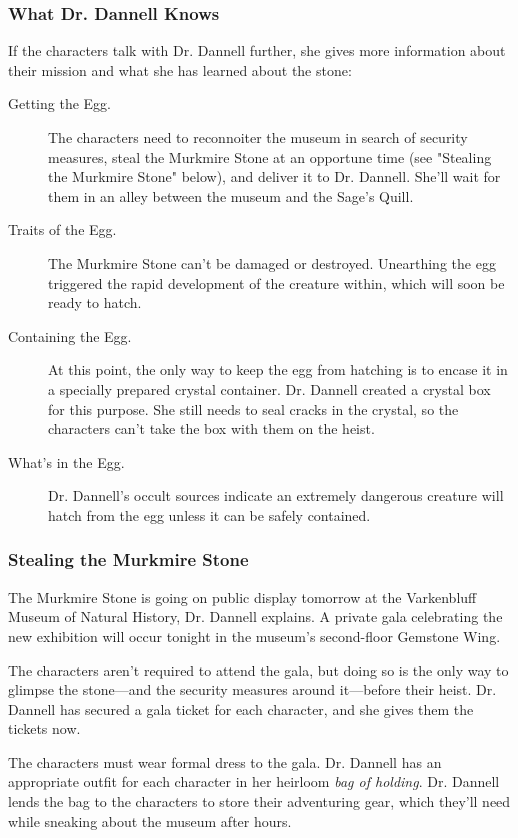 \documentclass[10pt,a4paper,twoside,bg=print,twocolumn,openany,nodeprecatedcode]{dndbook}
\begin{document}
\subsubsection{What Dr. Dannell Knows}
If the characters talk with Dr. Dannell further, she gives more information about their mission and what she has learned about the stone:


\begin{description}
\item[Getting the Egg.]
The characters need to reconnoiter the museum in search of security measures, steal the Murkmire Stone at an opportune time (see "Stealing the Murkmire Stone" below), and deliver it to Dr. Dannell. She'll wait for them in an alley between the museum and the Sage's Quill.
\item[Traits of the Egg.]
The Murkmire Stone can't be damaged or destroyed. Unearthing the egg triggered the rapid development of the creature within, which will soon be ready to hatch.
\item[Containing the Egg.]
At this point, the only way to keep the egg from hatching is to encase it in a specially prepared crystal container. Dr. Dannell created a crystal box for this purpose. She still needs to seal cracks in the crystal, so the characters can't take the box with them on the heist.
\item[What's in the Egg.]
Dr. Dannell's occult sources indicate an extremely dangerous creature will hatch from the egg unless it can be safely contained.
\end{description}

\subsubsection{Stealing the Murkmire Stone}
The Murkmire Stone is going on public display tomorrow at the Varkenbluff Museum of Natural History, Dr. Dannell explains. A private gala celebrating the new exhibition will occur tonight in the museum's second-floor Gemstone Wing.

The characters aren't required to attend the gala, but doing so is the only way to glimpse the stone—and the security measures around it—before their heist. Dr. Dannell has secured a gala ticket for each character, and she gives them the tickets now.

The characters must wear formal dress to the gala. Dr. Dannell has an appropriate outfit for each character in her heirloom \textit{bag of holding}. Dr. Dannell lends the bag to the characters to store their adventuring gear, which they'll need while sneaking about the museum after hours.
\end{document}
